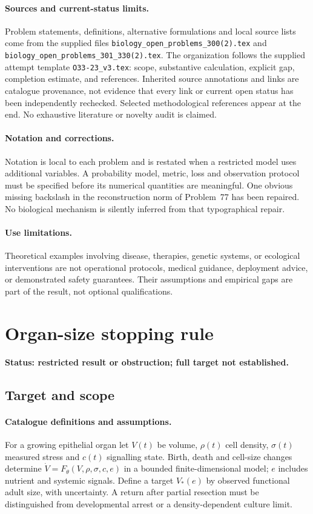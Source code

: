 \documentclass[11pt]{article}
\begin{document}
\paragraph{Sources and current-status limits.}
Problem statements, definitions, alternative formulations and local source lists
come from the supplied files
\texttt{biology\_open\_problems\_300(2).tex} and
\texttt{biology\_open\_problems\_301\_330(2).tex}.
The organization follows the supplied attempt template
\texttt{O33-23\_v3.tex}: scope, substantive calculation, explicit gap,
completion estimate, and references. Inherited source annotations and links are
catalogue provenance, not evidence that every link or current open status has
been independently rechecked. Selected methodological references appear at the
end. No exhaustive literature or novelty audit is claimed.

\paragraph{Notation and corrections.}
Notation is local to each problem and is restated when a restricted model uses
additional variables. A probability model, metric, loss and observation protocol
must be specified before its numerical quantities are meaningful. One obvious
missing backslash in the reconstruction norm of Problem~77 has been repaired.
No biological mechanism is silently inferred from that typographical repair.

\paragraph{Use limitations.}
Theoretical examples involving disease, therapies, genetic systems, or ecological
interventions are not operational protocols, medical guidance, deployment advice,
or demonstrated safety guarantees. Their assumptions and empirical gaps are part
of the result, not optional qualifications.


\section*{Organ-size stopping rule}
\label{prob:128}
\noindent\textbf{Status: restricted result or obstruction; full target not established.}
\subsection{Target and scope}
\paragraph{Catalogue definitions and assumptions.}
For a growing epithelial organ let $V(t)$ be volume, $\rho(t)$ cell density, $\sigma(t)$ measured stress and $c(t)$ signalling state. Birth, death and cell-size changes determine $\dot V=F_\theta(V,\rho,\sigma,c,e)$ in a bounded finite-dimensional model; $e$ includes nutrient and systemic signals. Define a target $V_*(e)$ by observed functional adult size, with uncertainty. A return after partial resection must be distinguished from developmental arrest or a density-dependent culture limit.
\end{document}
